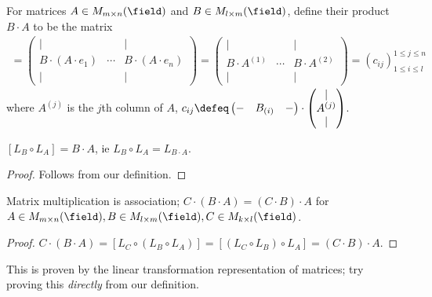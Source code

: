 \begin{definition}
    For matrices $A \in M_{m \times n}(\field)$ and $B \in M_{l \times m}(\field)$, define their product $B \cdot A$ to be the matrix \begin{align*}
        [L_B \circ L_A] =
        \begin{pmatrix}
            \vert &  & \vert\\
            B\cdot (A \cdot e_1) & \cdots & B \cdot (A \cdot e_n)\\
            \vert & & \vert
        \end{pmatrix} = \begin{pmatrix}
            \vert & & \vert\\
            B \cdot A^{(1)} &\cdots & B \cdot A^{(2)}\\
            \vert & & \vert
        \end{pmatrix} = \left(c_{ij}\right)_{1 \leq i \leq l}^{1 \leq j \leq n}
    \end{align*}
    where $A^{(j)}$ is the $j$th column of $A$, $c_{ij} \defeq \begin{pmatrix}
        - & B_{(i)} & - 
    \end{pmatrix} \cdot \begin{pmatrix}
        \vert \\
        A^{(j)}\\
        \vert
    \end{pmatrix}$.
\end{definition}

\begin{proposition}
    $[L_B \circ L_A] = B \cdot A$, ie $L_B \circ L_A = L_{B \cdot A}$.
\end{proposition}
\begin{proof}
    Follows from our definition.
\end{proof}

\begin{corollary}
    Matrix multiplication is association; $C \cdot (B \cdot A) = (C \cdot B) \cdot A$ for $A \in M_{m \times n}(\field), B \in M_{l \times m}(\field), C \in M_{k \times l}(\field)$.
\end{corollary}
\begin{proof}
    $C\cdot (B \cdot A) = [L_C \circ (L_B \circ L_A)] = [(L_C\circ L_B) \circ L_A] = (C \cdot B) \cdot A$.
\end{proof}

\begin{remark}
    This is proven by the linear transformation representation of matrices; try proving this \emph{directly} from our definition.
\end{remark}

